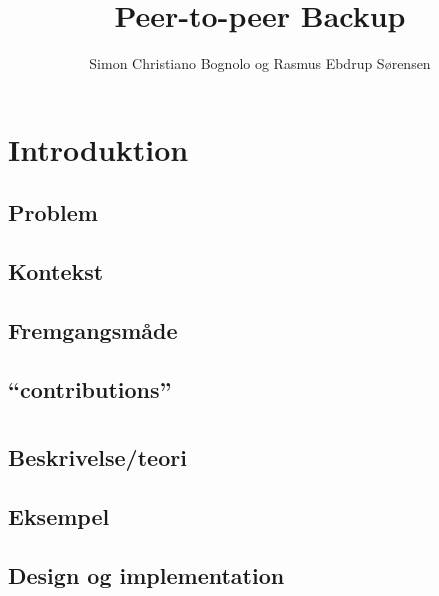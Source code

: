 

\usepackage{biblatex}

\title{Peer-to-peer Backup}
\author{Simon Christiano Bognolo og Rasmus Ebdrup Sørensen}



\frontmatter
\small
\tableofcontents
\normalsize
\newpage

\listoffixmes
 \newpage
\lstlistoflistings
 \newpage

\savepagenumber
\mainmatter
\linespread{1.5}
\selectfont

\chapter{Introduktion}
  \section{Problem}	 
  \section{Kontekst}
  \section{Fremgangsmåde}
  \section{``contributions''}

\chapter{\ds}
  \section{Beskrivelse/teori}
  \section{Eksempel}
  \section{Design og implementation}
